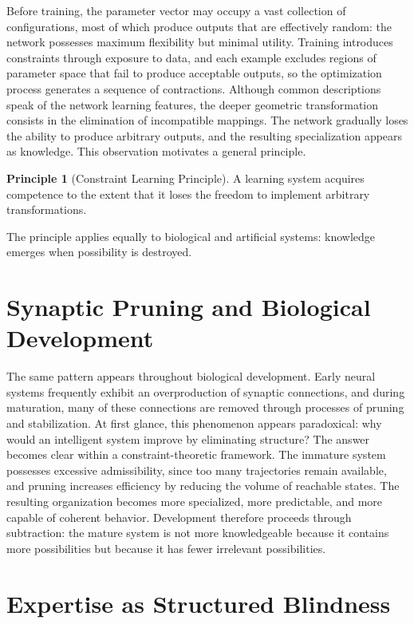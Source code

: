 \documentclass[11pt,oneside]{book}
\theoremstyle{plain}
\theoremstyle{definition}
\newtheorem{principle}[theorem]{Principle}
\theoremstyle{remark}
\begin{document}
Before training, the parameter vector may occupy a vast collection of configurations, most of which produce outputs that are effectively random: the network possesses maximum flexibility but minimal utility. Training introduces constraints through exposure to data, and each example excludes regions of parameter space that fail to produce acceptable outputs, so the optimization process generates a sequence of contractions. Although common descriptions speak of the network learning features, the deeper geometric transformation consists in the elimination of incompatible mappings. The network gradually loses the ability to produce arbitrary outputs, and the resulting specialization appears as knowledge. This observation motivates a general principle.

\begin{principle}[Constraint Learning Principle]
A learning system acquires competence to the extent that it loses the freedom to implement arbitrary transformations.
\end{principle}

The principle applies equally to biological and artificial systems: knowledge emerges when possibility is destroyed.

\section{Synaptic Pruning and Biological Development}

The same pattern appears throughout biological development. Early neural systems frequently exhibit an overproduction of synaptic connections, and during maturation, many of these connections are removed through processes of pruning and stabilization. At first glance, this phenomenon appears paradoxical: why would an intelligent system improve by eliminating structure? The answer becomes clear within a constraint-theoretic framework. The immature system possesses excessive admissibility, since too many trajectories remain available, and pruning increases efficiency by reducing the volume of reachable states. The resulting organization becomes more specialized, more predictable, and more capable of coherent behavior. Development therefore proceeds through subtraction: the mature system is not more knowledgeable because it contains more possibilities but because it has fewer irrelevant possibilities.

\section{Expertise as Structured Blindness}
\end{document}
